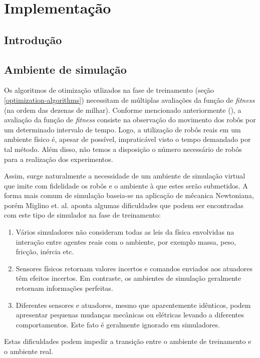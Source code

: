 \chapter{Implementação}
\label{implementacao}

\section{Introdução}

\section{Ambiente de simulação}

Os algoritmos de otimização utlizados na fase de treinamento (seção \ref{optimization-algorithms}) necessitam de múltiplas avaliações da função de \textit{fitness} (na ordem das dezenas de milhar). Conforme mencionado anteriormente (), a avaliação da função de \textit{fitness} consiste na observação do movimento dos robôs por um determinado intervalo de tempo. Logo, a utilização de robôs reais em um ambiente físico é, apesar de possível, impraticável visto o tempo demandado por tal método. Além disso, não temos a disposição o número necessário de robôs para a realização dos experimentos.

Assim, surge naturalmente a necessidade de um ambiente de simulação virtual que imite com fidelidade os robôs e o ambiente à que estes serão submetidos. A forma mais comum de simulação baseia-se na aplicação de mêcanica Newtoniana, porém Miglino et. al. \cite{miglino96evolving} aponta algumas dificuldades que podem ser encontradas com este tipo de simulador na fase de treinamento:
\begin{enumerate}
    \item Vários simuladores não consideram todas as leis da física envolvidas na interação entre agentes reais com o ambiente, por exemplo massa, peso, fricção, inércia etc.
    \item Sensores físicos retornam valores incertos e comandos enviados aos atuadores têm efeitos incertos. Em contraste, os ambientes de simulação geralmente retornam informações perfeitas.
    \item Diferentes sensores e atuadores, mesmo que aparentemente idênticos, podem apresentar pequenas mudanças mecânicas ou elétricas levando a diferentes comportamentos. Este fato é geralmente ignorado em simuladores.
\end{enumerate}

Estas dificuldades podem impedir a transição entre o ambiente de treinamento e o ambiente real.

